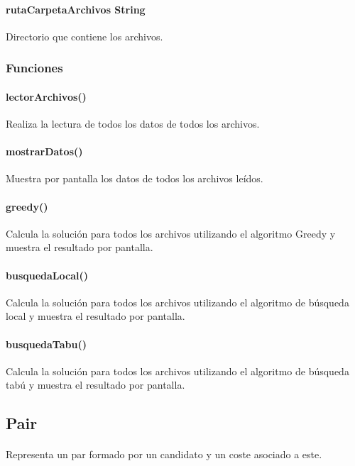 \documentclass{article}
\begin{document}
	\paragraph{rutaCarpetaArchivos String}Directorio que contiene los archivos.
	
	\subsubsection{Funciones}
	
	\paragraph{lectorArchivos()}Realiza la lectura de todos los datos de todos los archivos.
	
	\paragraph{mostrarDatos()}Muestra por pantalla los datos de todos los archivos leídos.
	
	\paragraph{greedy()}Calcula la solución para todos los archivos utilizando el algoritmo Greedy y muestra el resultado por pantalla.
	
	\paragraph{busquedaLocal()}Calcula la solución para todos los archivos utilizando el algoritmo de búsqueda local y muestra el resultado por pantalla.
	
	\paragraph{busquedaTabu()}Calcula la solución para todos los archivos utilizando el algoritmo de búsqueda tabú y muestra el resultado por pantalla.
	
	\subsection{Pair}
	
	\paragraph{}Representa un par formado por un candidato y un coste asociado a este.
	
\end{document}
